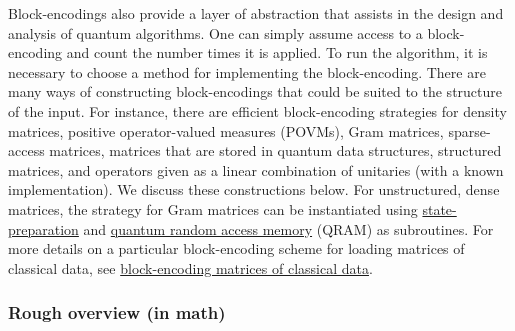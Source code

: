 \begin{refsection}
Block-encodings also provide a layer of abstraction that assists in the design and analysis of quantum algorithms. One can simply assume access to a block-encoding and count the number times it is applied. To run the algorithm, it is necessary to choose a method for implementing the block-encoding. There are many ways of constructing block-encodings that could be suited to the structure of the input. For instance, there are efficient block-encoding strategies for density matrices, positive operator-valued measures (POVMs), Gram matrices, sparse-access matrices, matrices that are stored in quantum data structures, structured matrices, and operators given as a linear combination of unitaries (with a known implementation). We discuss these constructions below. For unstructured, dense matrices, the strategy for Gram matrices can be instantiated using \hyperref[prim:StatePrepData]{state-preparation} and \hyperref[prim:QRAM]{quantum random access memory} (QRAM) as subroutines. For more details on a particular block-encoding scheme for loading matrices of classical data, see \hyperref[prim:BlockEncodingsClassical]{block-encoding matrices of classical data}.



\subsubsection*{Rough overview (in math)}


\end{refsection}
